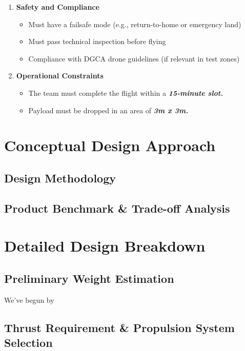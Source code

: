 \documentclass[12pt]{report}
\begin{document}
\begin{enumerate}
\begin{itemize}
        \end{itemize}
      \item \textbf{Safety and Compliance}
        \begin{itemize}
          \item Must have a failsafe mode (e.g., return-to-home or emergency land)
          \item Must pass technical inspection before flying
          \item Compliance with DGCA drone guidelines (if relevant in test zones)
        \end{itemize}
      \item \textbf{Operational Constraints}
        \begin{itemize}
          \item The team must complete the flight within a \textbf{\textit{15-minute slot.}}
          \item Payload must be dropped in an area of \textbf{\textit{3m x 3m.}}
        \end{itemize}
    \end{enumerate}
  \chapter{Conceptual Design Approach}
    \section{Design Methodology}
    \section{Product Benchmark \& Trade-off Analysis} %
                                                 
  \chapter{Detailed Design Breakdown}                                 
    \section{Preliminary Weight Estimation}We’ve begun by

    \section{Thrust Requirement \& Propulsion System Selection}
\end{document}
